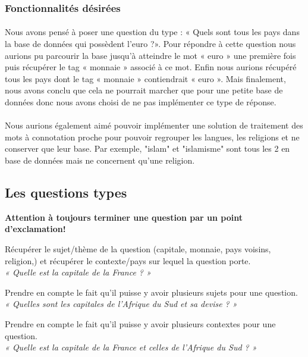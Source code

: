 \documentclass[11pt,a4paper]{article}
\begin{document}
\subsubsection{Fonctionnalités désirées}

\paragraph{}Nous avons pensé à poser une question du type : «  Quels sont tous les pays dans la base de données qui possèdent l’euro ?». Pour répondre à cette question nous aurions pu parcourir la base jusqu'à atteindre le mot « euro » une première fois puis  récupérer le tag « monnaie » associé à ce mot. Enfin nous aurions récupéré tous les pays dont le tag « monnaie » contiendrait « euro ». Mais finalement, nous avons conclu que cela ne pourrait marcher que pour une petite base de données donc nous avons choisi de ne pas implémenter ce type de réponse. 
\paragraph{}Nous aurions également aimé pouvoir implémenter une solution de traitement des mots à connotation proche pour pouvoir regrouper les langues, les religions et ne conserver que leur base. Par exemple, "islam" et "islamisme" sont tous les 2 en base de données mais ne concernent qu'une religion.

\subsection{Les questions types}

\textbf{Attention à toujours terminer une question par un point d'exclamation!}


Récupérer le sujet/thème de la question (capitale, monnaie, pays voisins, religion,) et récupérer le contexte/pays sur lequel la question porte. \\
\textit{« Quelle est la capitale de la France ? » }

Prendre en compte le fait qu’il puisse y avoir plusieurs sujets pour une question. \\
\textit{« Quelles sont les capitales de l’Afrique du Sud et sa devise ? »}

Prendre en compte le fait qu’il puisse y avoir plusieurs contextes pour une question. \\
\textit{« Quelle est la capitale de la France et celles de l’Afrique du Sud ? »}
\end{document}
